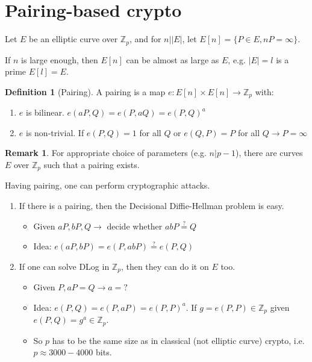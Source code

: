 \documentclass[11pt]{article}
\theoremstyle{definition}
\newtheorem{definition}{Definition}[section]
\newtheorem{remark}{Remark}[section]
\theoremstyle{proof}
\begin{document}
\section{Pairing-based crypto}

Let $E$ be an elliptic curve over $\mathbb{Z}_p$, and for $n | |E|$, let $E[n] = \{P \in E, nP = \infty\}$.

If $n$ is large enough, then $E[n]$ can be almost as large as $E$, e.g. $|E| = l$ is a prime $E[l] = E$.

\begin{definition}[Pairing]
	A pairing is a map $e: E[n] \times E[n] \rightarrow \mathbb{Z}_p$ with:
	
	\begin{enumerate}
		\item $e$ is bilinear. $e(aP, Q) = e(P, aQ) = e(P, Q)^a$
		\item $e$ is non-trivial. If $e(P, Q) = 1$ for all $Q$ or $e(Q, P) = P$ for all $Q \rightarrow P = \infty$ 
	\end{enumerate}
\end{definition}

\begin{remark}
	For appropriate choice of parameters (e.g. $n | p-1$), there are curves $E$ over $\mathbb{Z}_p$ such that a pairing exists.
\end{remark}

Having pairing, one can perform cryptographic attacks.

\begin{enumerate}
	\item If there is a pairing, then the Decisional Diffie-Hellman problem is easy.
	\begin{itemize}
		\item Given $aP, bP, Q \rightarrow$ decide whether $abP \stackrel{?}{=}Q$
		\item Idea: $e(aP, bP) = e(P, abP) \stackrel{?}{=} e(P, Q)$
	\end{itemize}
	\item If one can solve DLog in $\mathbb{Z}_p$, then they can do it on $E$ too.
	\begin{itemize}
		\item Given $P, aP = Q \rightarrow a = ?$
		\item Idea: $e(P, Q) = e(P, aP) = e(P, P)^a$. If $g = e(P, P) \in \mathbb{Z}_p$ given $e(P, Q) = g^a \in \mathbb{Z}_p$.
		\item So $p$ has to be the same size as in classical (not elliptic curve) crypto, i.e. $p \approx 3000-4000$ bits.
	\end{itemize}
\end{enumerate}
\end{document}
